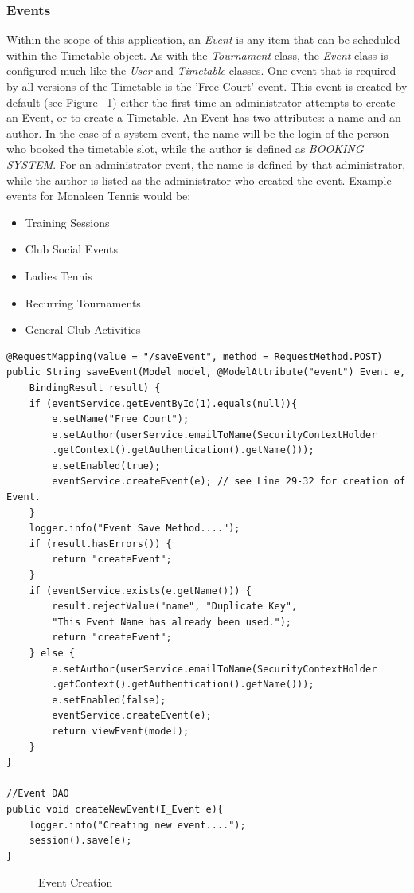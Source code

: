 \subsubsection{Events}

Within the scope of this application, an \textit{Event} is any item that can be scheduled within the Timetable object. As with the \textit{Tournament} class, the \textit{Event} class is configured much like the \textit{User} and \textit{Timetable} classes. One event that is required by all versions of the Timetable is the 'Free Court' event. This event is created by default (see Figure ~\ref{fig:createEvent}) either the first time an administrator attempts to create an Event, or to create a Timetable. An Event has two attributes: a name and an author. In the case of a system event, the name will be the login of the person who booked the timetable slot, while the author is defined as \textit{BOOKING SYSTEM}. For an administrator event, the name is defined by that administrator, while the author is listed as the administrator who created the event. Example events for Monaleen Tennis would be:

\begin{itemize}
\item Training Sessions
\item Club Social Events
\item Ladies Tennis
\item Recurring Tournaments
\item General Club Activities
\end{itemize}

\begin{lstlisting}
@RequestMapping(value = "/saveEvent", method = RequestMethod.POST)
public String saveEvent(Model model, @ModelAttribute("event") Event e,
	BindingResult result) {
	if (eventService.getEventById(1).equals(null)){
		e.setName("Free Court");
		e.setAuthor(userService.emailToName(SecurityContextHolder
		.getContext().getAuthentication().getName()));
		e.setEnabled(true);
		eventService.createEvent(e); // see Line 29-32 for creation of Event.
	}
	logger.info("Event Save Method....");
	if (result.hasErrors()) {
		return "createEvent";
	}
	if (eventService.exists(e.getName())) {
		result.rejectValue("name", "Duplicate Key",
		"This Event Name has already been used.");
		return "createEvent";
	} else {
		e.setAuthor(userService.emailToName(SecurityContextHolder
		.getContext().getAuthentication().getName()));
		e.setEnabled(false);
		eventService.createEvent(e);
		return viewEvent(model);
	}
}

//Event DAO 
public void createNewEvent(I_Event e){
	logger.info("Creating new event....");
	session().save(e);
}
\end{lstlisting}
\begin{figure}[H]
\caption{Event Creation}
\label{fig:createEvent}
\end{figure}

